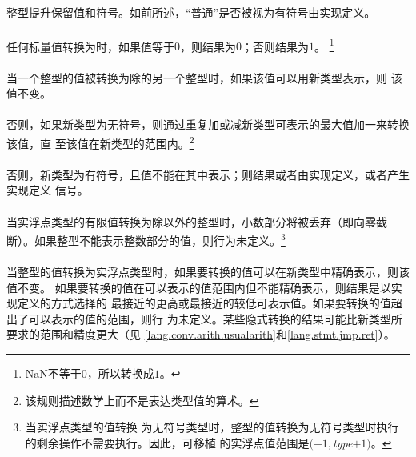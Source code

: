 {\paragraph{}
整型提升保留值和符号。如前所述，``普通''是否被视为有符号由实现定义。


\paragraph{}
任何标量值转换为时，如果值等于$0$，则结果为$0$；否则结果为$1$。
\footnote{NaN不等于$0$，所以转换成$1$。}

\paragraph{}
当一个整型的值被转换为除的另一个整型时，如果该值可以用新类型表示，则
该值不变。

\paragraph{}
否则，如果新类型为无符号，则通过重复加或减新类型可表示的最大值加一来转换该值，直
至该值在新类型的范围内。\footnote{该规则描述数学上而不是表达类型值的算术。}

\paragraph{}
否则，新类型为有符号，且值不能在其中表示；则结果或者由实现定义，或者产生实现定义
信号。

\paragraph{}
当实浮点类型的有限值转换为除以外的整型时，小数部分将被丢弃（即向零截
断）。如果整型不能表示整数部分的值，则行为未定义。\footnote{当实浮点类型的值转换
为无符号类型时，整型的值转换为无符号类型时执行的剩余操作不需要执行。因此，可移植
的实浮点值范围是$(-1,$\textit{type}$+1)$。}

\paragraph{}
当整型的值转换为实浮点类型时，如果要转换的值可以在新类型中精确表示，则该值不变。
如果要转换的值在可以表示的值范围内但不能精确表示，则结果是以实现定义的方式选择的
最接近的更高或最接近的较低可表示值。如果要转换的值超出了可以表示的值的范围，则行
为未定义。某些隐式转换的结果可能比新类型所要求的范围和精度更大（见
\ref{lang.conv.arith.usualarith}和\ref{lang.stmt.jmp.ret}）。

}
